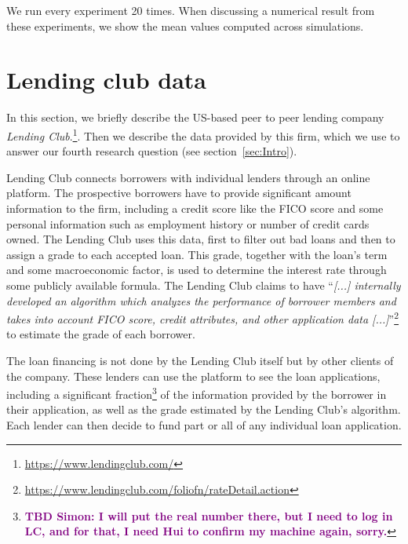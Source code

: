 \documentclass[12pt]{article} %
\newcommand{\simon}[1]{\textcolor{purple}{\textbf{TBD Simon: #1}}}
\begin{document}
We run every experiment 20 times. When discussing a numerical result from these experiments, we show the mean values computed across simulations. 



\section{Lending club data}
\label{sec:lending_club_data}
In this section, we briefly describe the US-based peer to peer lending company \textit{Lending Club}.\footnote{\url{https://www.lendingclub.com/}}. Then we describe the data provided by this firm, which we use to answer our fourth research question (see section~\ref{sec:Intro}). 

Lending Club connects borrowers with individual lenders through an online platform. The prospective borrowers have to provide significant amount information to the firm, including a credit score like the FICO score and some personal information such as employment history or number of credit cards owned. The Lending Club uses this data, first to filter out bad loans and then to assign a grade to each accepted loan. This grade, together with the loan's term and some macroeconomic factor, is used to determine the interest rate through some publicly available formula. The Lending Club claims to have ``\textit{[...] internally developed an algorithm which analyzes the performance of borrower members and takes into account FICO score, credit attributes, and other application data [...]}''\footnote{\url{https://www.lendingclub.com/foliofn/rateDetail.action}} to estimate the grade of each borrower.

The loan financing is not done by the Lending Club itself but by other clients of the company. These lenders can use the platform to see the loan applications, including a significant fraction\footnote{\simon{ I will put the real number there, but I need to log in LC, and for that, I need Hui to confirm my machine again, sorry.}} of the information provided by the borrower in their application, as well as the grade estimated by the Lending Club's algorithm. Each lender can then decide to fund part or all of any individual loan application. 
\end{document}
